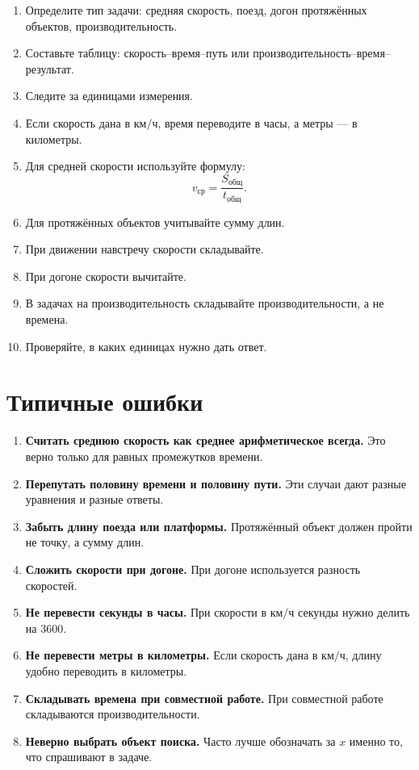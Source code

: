 \documentclass[a4paper,12pt]{article}
\newcommand{\important}[1]{\textcolor{darkaccent}{\textbf{#1}}}
\newcommand{\kmh}{\text{км/ч}}
\begin{document}
\begin{enumerate}
    \item Определите тип задачи: средняя скорость, поезд, догон протяжённых объектов, производительность.
    \item Составьте таблицу: скорость--время--путь или производительность--время--результат.
    \item Следите за единицами измерения.
    \item Если скорость дана в $\kmh$, время переводите в часы, а метры --- в километры.
    \item Для средней скорости используйте формулу:
    \[
    v_{\text{ср}}=\frac{S_{\text{общ}}}{t_{\text{общ}}}.
    \]
    \item Для протяжённых объектов учитывайте сумму длин.
    \item При движении навстречу скорости складывайте.
    \item При догоне скорости вычитайте.
    \item В задачах на производительность складывайте производительности, а не времена.
    \item Проверяйте, в каких единицах нужно дать ответ.
\end{enumerate}

\section{Типичные ошибки}

\begin{enumerate}
    \item \important{Считать среднюю скорость как среднее арифметическое всегда.} Это верно только для равных промежутков времени.
    \item \important{Перепутать половину времени и половину пути.} Эти случаи дают разные уравнения и разные ответы.
    \item \important{Забыть длину поезда или платформы.} Протяжённый объект должен пройти не точку, а сумму длин.
    \item \important{Сложить скорости при догоне.} При догоне используется разность скоростей.
    \item \important{Не перевести секунды в часы.} При скорости в $\kmh$ секунды нужно делить на $3600$.
    \item \important{Не перевести метры в километры.} Если скорость дана в $\kmh$, длину удобно переводить в километры.
    \item \important{Складывать времена при совместной работе.} При совместной работе складываются производительности.
    \item \important{Неверно выбрать объект поиска.} Часто лучше обозначать за $x$ именно то, что спрашивают в задаче.
\end{enumerate}
\end{document}
